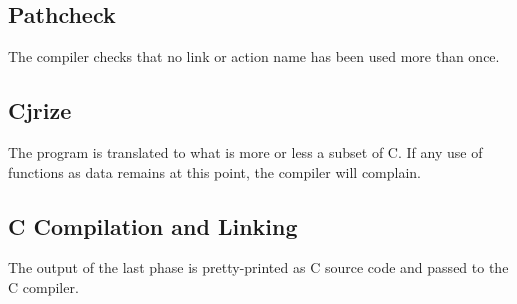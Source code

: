 \documentclass{article}
\begin{document}
\subsection{Pathcheck}

The compiler checks that no link or action name has been used more than once.

\subsection{Cjrize}

The program is translated to what is more or less a subset of C.  If any use of functions as data remains at this point, the compiler will complain.

\subsection{C Compilation and Linking}

The output of the last phase is pretty-printed as C source code and passed to the C compiler.
\end{document}
